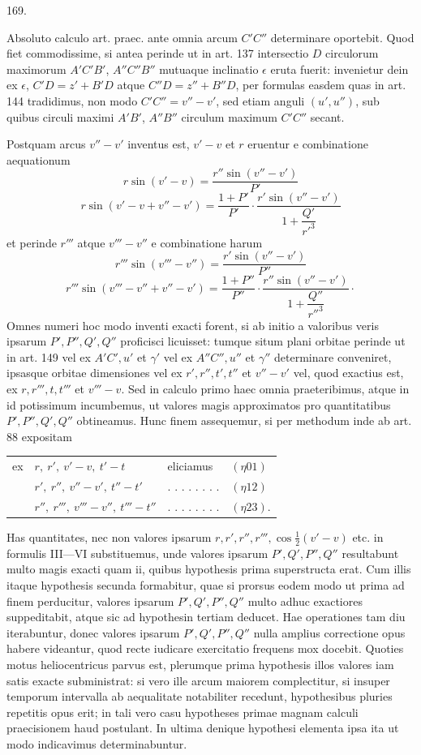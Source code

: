 \par{}\medskip
\begin{center}\hypertarget{native-234-article169}{}169.\end{center}
Absoluto calculo art. praec. ante omnia arcum $C'C''$ determinare oportebit. Quod fiet commodissime, si antea perinde ut in art. 137 intersectio $D$ circulorum maximorum $A'C'B'$, $A''C''B''$ mutuaque inclinatio $\epsilon$ eruta fuerit: invenietur dein ex $\epsilon$, $C'D=z'+B'D$ atque $C''D=z''+B''D$, per formulas easdem quas in art. 144 tradidimus, non modo $C'C''=v''-v'$, sed etiam anguli $(u',u'')$, sub quibus circuli maximi $A'B'$, $A''B''$ circulum maximum $C'C''$ secant.

Postquam arcus $v''-v'$ inventus est, $v'-v$ et $r$ eruentur e combinatione aequationum
\[
r\sin(v'-v)=\frac{r''\sin(v''-v')}{P'}
\]
\[
r\sin(v'-v+v''-v')=\frac{1+P'}{P'}\cdot\frac{r'\sin(v''-v')}{1+\dfrac{Q'}{r'^3}}
\]
et perinde $r'''$ atque $v'''-v''$ e combinatione harum
\[
r'''\sin(v'''-v'')=\frac{r'\sin(v''-v')}{P''}
\]
\[
r'''\sin(v'''-v''+v''-v')=\frac{1+P''}{P''}\cdot\frac{r''\sin(v''-v')}{1+\dfrac{Q''}{r''^3}}\mathpunct{\cdot}
\]
Omnes numeri hoc modo inventi exacti forent, si ab initio a valoribus veris ipsarum $P',P'',Q',Q''$ proficisci licuisset: tumque situm plani orbitae perinde ut in art. 149 vel ex $A'C',u'$ et $\gamma'$ vel ex $A''C'',u''$ et $\gamma''$ determinare conveniret, ipsasque orbitae dimensiones vel ex $r',r'',t',t''$ et $v''-v'$ vel, quod exactius est, ex $r,r''',t,t'''$ et $v'''-v$. Sed in calculo primo haec omnia praeteribimus, atque in id potissimum incumbemus, ut valores magis approximatos pro quantitatibus $P',P'',Q',Q''$ obtineamus. Hunc finem assequemur, si per methodum inde ab art. 88 expositam
\begin{center}
\begin{tabular}{@{}llll@{}}
ex & $r,\ r',\ v'-v,\ t'-t$ & eliciamus & $(\eta01)$\\
& $r',\ r'',\ v''-v',\ t''-t'$ & . . . . . . . . & $(\eta12)$\\
& $r'',\ r''',\ v'''-v'',\ t'''-t''$ & . . . . . . . . & $(\eta23)$.
\end{tabular}
\end{center}
Has quantitates, nec non valores ipsarum $r,r',r'',r''',\cos\tfrac12(v'-v)$ etc. in formulis III—VI substituemus, unde valores ipsarum $P',Q',P'',Q''$ resultabunt multo magis exacti quam ii, quibus hypothesis prima superstructa erat. Cum illis itaque hypothesis secunda formabitur, quae si prorsus eodem modo ut prima ad finem perducitur, valores ipsarum $P',Q',P'',Q''$ multo adhuc exactiores suppeditabit, atque sic ad hypothesin tertiam deducet. Hae operationes tam diu iterabuntur, donec valores ipsarum $P',Q',P'',Q''$ nulla amplius correctione opus habere videantur, quod recte iudicare exercitatio frequens mox docebit. Quoties motus heliocentricus parvus est, plerumque prima hypothesis illos valores iam satis exacte subministrat: si vero ille arcum maiorem complectitur, si insuper temporum intervalla ab aequalitate notabiliter recedunt, hypothesibus pluries repetitis opus erit; in tali vero casu hypotheses primae magnam calculi praecisionem haud postulant. In ultima denique hypothesi elementa ipsa ita ut modo indicavimus determinabuntur.
